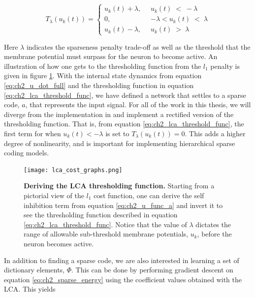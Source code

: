\begin{equation}\label{eq:ch2_lca_threshold_func}
    T_{\lambda}(u_{k}(t)) = \left\{
    \begin{aligned}
        u_{k}(t)+\lambda,\;\; &u_{k}(t)\; <\; -\lambda \\
        0,\;\; &-\lambda < u_{k}(t)\; <\; \lambda \\
        u_{k}(t)-\lambda,\;\; &u_{k}(t)\; >\; \lambda
    \end{aligned}
    \right.
\end{equation}

Here $\lambda$ indicates the sparseness penalty trade-off as well as the threshold that the membrane potential must surpass for the neuron to become active. An illustration of how one gets to the thresholding function from the $l_{1}$ penalty is given in figure \ref{fig:ch2_lca_thresh}. With the internal state dynamics from equation \eqref{eq:ch2_u_dot_full} and the thresholding function in equation \eqref{eq:ch2_lca_threshold_func}, we have defined a network that settles to a sparse code, $a$, that represents the input signal. For all of the work in this thesis, we will diverge from the implementation in \parencite{rozell2008sparse} and implement a rectified version of the thresholding function. That is, from equation \eqref{eq:ch2_lca_threshold_func}, the first term for when $u_{k}(t) < -\lambda$ is set to $T_{\lambda}(u_{k}(t))=0$. This adds a higher degree of nonlinearity, and is important for implementing hierarchical sparse coding models.

\begin{figure}[h]
    \centering %
    \texttt{[image: lca\_cost\_graphs.png]}
    \caption{\textbf{Deriving the LCA thresholding function.} Starting from a pictorial view of the $l_{1}$ cost function, one can derive the self inhibition term from equation \eqref{eq:ch2_u_func_a} and invert it to see the thresholding function described in equation \eqref{eq:ch2_lca_threshold_func}. Notice that the value of $\lambda$ dictates the range of allowable sub-threshold membrane potentials, $u_{k}$, before the neuron becomes active.}
    \label{fig:ch2_lca_thresh}
\end{figure}

In addition to finding a sparse code, we are also interested in learning a set of dictionary elements, $\Phi$. This can be done by performing gradient descent on equation \eqref{eq:ch2_sparse_energy} using the coefficient values obtained with the LCA. This yields

